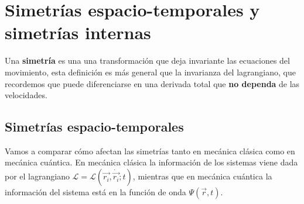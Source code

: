 \section{Simetrías espacio-temporales y simetrías internas}
Una \textbf{simetría} es una una transformación que deja invariante las ecuaciones del movimiento, esta definición es más general que la invarianza del lagrangiano, que recordemos que puede diferenciarse en una derivada total que \textbf{no dependa} de las velocidades.
\newpage
\subsection{Simetrías espacio-temporales}
Vamos a comparar cómo afectan las simetrías tanto en mecánica clásica como en mecánica cuántica. En mecánica clásica la información de los sistemas viene dada por el lagrangiano $\mathcal{L}=\mathcal{L}(\vec{r_i},\dot{\vec{r_i}};t)$, mientras que en mecánica cuántica la información del sistema está en la función de onda $\Psi(\vec{r},t)$.
